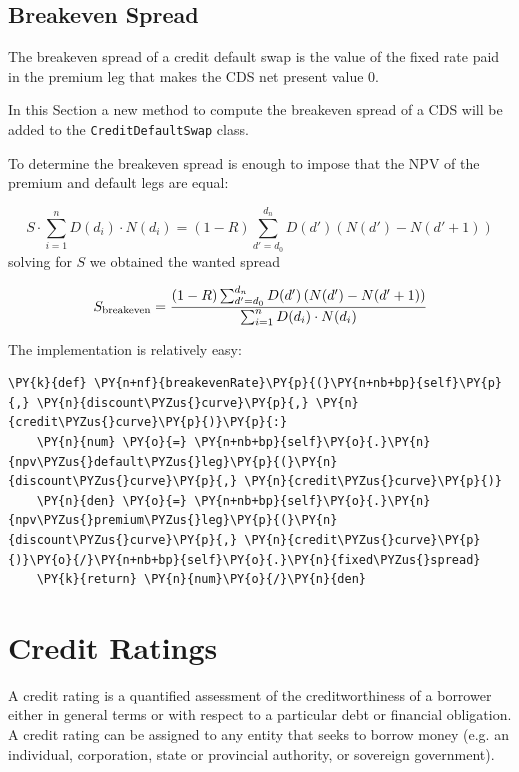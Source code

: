 \subsection{Breakeven Spread}
The breakeven spread of a credit default swap is the value of the fixed rate paid in the premium leg that makes the CDS net present value 0.

In this Section a new method to compute the breakeven spread of a CDS will be added to the \texttt{CreditDefaultSwap} class.

To determine the breakeven spread is enough to impose that the NPV of the premium and default legs are equal:

\[
S \cdot\sum_{i=1}^{n} D(d_i) \cdot N(d_i)
= (1-R) \sum_{d'=d_0}^{d_n} D(d') \left( N(d') - N(d'+1) \right)
\]
solving for $S$ we obtained the wanted spread

\[
S_{\mathrm{breakeven}} = \cfrac{(1-R) \sum_{d'=d_0}^{d_n} D(d') \left( N(d') - N(d'+1) \right)}{\sum_{i=1}^{n} D(d_i) \cdot N(d_i)}
\]

The implementation is relatively easy:

\begin{tcolorbox}[breakable, size=fbox, boxrule=1pt, pad at break*=1mm,colback=cellbackground, colframe=cellborder]
\begin{Verbatim}[commandchars=\\\{\}]
  \PY{k}{def} \PY{n+nf}{breakevenRate}\PY{p}{(}\PY{n+nb+bp}{self}\PY{p}{,} \PY{n}{discount\PYZus{}curve}\PY{p}{,} \PY{n}{credit\PYZus{}curve}\PY{p}{)}\PY{p}{:}
    \PY{n}{num} \PY{o}{=} \PY{n+nb+bp}{self}\PY{o}{.}\PY{n}{npv\PYZus{}default\PYZus{}leg}\PY{p}{(}\PY{n}{discount\PYZus{}curve}\PY{p}{,} \PY{n}{credit\PYZus{}curve}\PY{p}{)}
    \PY{n}{den} \PY{o}{=} \PY{n+nb+bp}{self}\PY{o}{.}\PY{n}{npv\PYZus{}premium\PYZus{}leg}\PY{p}{(}\PY{n}{discount\PYZus{}curve}\PY{p}{,} \PY{n}{credit\PYZus{}curve}\PY{p}{)}\PY{o}{/}\PY{n+nb+bp}{self}\PY{o}{.}\PY{n}{fixed\PYZus{}spread}
    \PY{k}{return} \PY{n}{num}\PY{o}{/}\PY{n}{den}
\end{Verbatim}
\end{tcolorbox}

\section{Credit Ratings}\label{credit-ratings}

A credit rating is a quantified assessment of the creditworthiness of a
borrower either in general terms or with respect to a particular debt or
financial obligation. A credit rating can be assigned to any entity that
seeks to borrow money (e.g. an individual, corporation, state or
provincial authority, or sovereign government).


